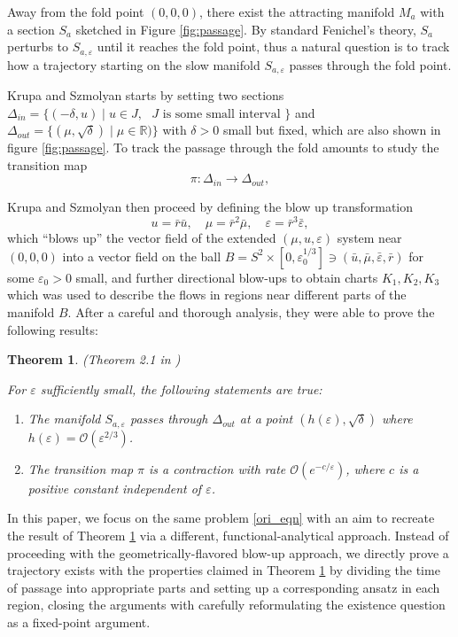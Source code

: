 \documentclass[letterpaper,11pt]{article}
\newcommand{\rmO}{\mathcal{O}}
\newcommand{\eps}{\varepsilon}
\numberwithin{equation}{section}
\theoremstyle{plain}
\newtheorem{Theorem}{Theorem}
\begin{document}
 Away from the fold point $(0,0,0)$, there exist the attracting manifold $M_a$ with a section $S_a$ sketched in Figure \ref{fig:passage}. By standard Fenichel's theory, $S_a$ perturbs to $S_{a,\eps}$ until it reaches the fold point, thus a natural question is to track how a trajectory starting on the slow manifold $S_{a,\eps}$ passes through the fold point.

Krupa and Szmolyan starts by setting two sections $\Delta_{in} = \{(-\delta, u) \mid u\in J,\text{ $J$ is some small interval }\}$ and $\Delta_{out} = \{( \mu ,\sqrt{\delta})\mid \mu \in \mathbb{R})\}$ with $\delta>0$ small but fixed, which are also shown in figure \ref{fig:passage}. To track the passage through the fold amounts to study the transition map 
\[
\pi: \Delta_{in} \to \Delta_{out},
\]

Krupa and Szmolyan then proceed by defining the blow up transformation
\[
u =\bar{r} \bar{u},  \quad \mu = \bar{r}^2 \bar{\mu}, \quad  \eps = \bar{r}^3 \bar{\eps},
\]
which ``blows up'' the vector field of the extended $(\mu, u, \eps)$ system near $(0,0,0)$ into a vector field on the ball $B = S^2 \times [0,\eps_0^{1/3}] \ni (\bar{u}, \bar{\mu}, \bar{\eps}, \bar{r})$ for some $\eps_0>0$ small, and further directional blow-ups to obtain charts $K_1,K_2,K_3$ which was used to describe the flows in regions near different parts of the manifold $B$. After a careful and thorough analysis, they were able to prove the following results:
\begin{Theorem}\label{ks_main}(Theorem 2.1 in \cite{KrupaSz})

For $\eps$ sufficiently small, the following statements are true:
\begin{enumerate}
\item The manifold $S_{a,\eps} $ passes through  $\Delta_{out}$ at a point $(h(\eps), \sqrt{\delta})$ where $h(\eps) = \rmO(\eps^{2/3})$.
\item The transition map $\pi$ is a contraction with rate $\rmO(e^{-c/\eps} )$, where $c$ is a positive constant independent of $\eps$.
\end{enumerate}
\end{Theorem}


In this paper, we focus on the same problem \eqref{ori_eqn} with an aim to recreate the result of Theorem \ref{ks_main} via a different, functional-analytical approach. Instead of proceeding with the geometrically-flavored blow-up approach, we directly prove a trajectory exists with the properties claimed in Theorem \ref{ks_main} by dividing the time of passage into appropriate parts and setting up a corresponding ansatz in each region, closing the arguments with carefully reformulating the existence question as a fixed-point argument.
\end{document}
